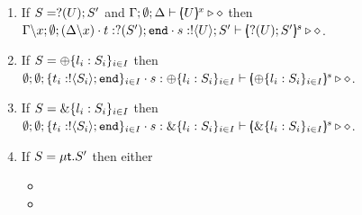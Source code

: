 \begin{proposition}
\begin{enumerate}
\begin{enumerate}
			\item	If $S = ? (U) ; S'$ and
					$\Gamma; \emptyset; \Delta \vdash [\!\!(U)\!\!]^{x}  \triangleright \diamond$ then 
					$\Gamma \backslash x; \emptyset; (\Delta\backslash x) \cdot t: ? (S') ; \mathtt{end} \cdot s: ! \langle U \rangle ; S' \vdash [\!\!(? (U) ; S')\!\!]^{s} \triangleright \diamond$.
	
			\item	If $S = \oplus \{l_i: S_i\}_{i \in I}$ then 
					$\emptyset; \emptyset; \{t_i: ! \langle S_i \rangle ; \mathtt{end}\}_{i \in I} \cdot s: \oplus \{l_i: S_i\}_{i \in I} \vdash [\!\!(\oplus \{l_i: S_i\}_{i \in I})\!\!]^{s} \triangleright \diamond$.
	
			\item	If $S = \& \{l_i: S_i\}_{i \in I}$ then 
					$\emptyset; \emptyset; \{t_i: ! \langle S_i \rangle ; \mathtt{end}\}_{i \in I} \cdot s: \& \{l_i: S_i\}_{i \in I} \vdash [\!\!(\& \{l_i: S_i\}_{i \in I})\!\!]^{s} \triangleright \diamond $.
	
			\item	If $S = \mu\mathsf{t}.S'$ then either
					\begin{itemize}
%

						\item {}

						\item {}
						
						
					\end{itemize}
			\end{enumerate}


\end{enumerate}
\end{proposition}
